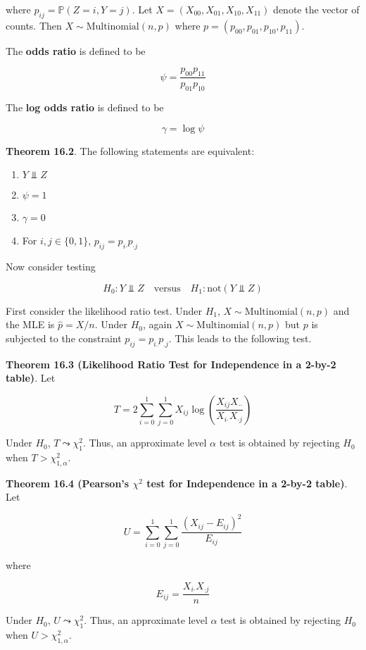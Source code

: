 where \(p_{ij} = \mathbb{P}(Z = i, Y = j)\). Let
\(X = (X_{00}, X_{01}, X_{10}, X_{11})\) denote the vector of counts.
Then \(X \sim \text{Multinomial}(n, p)\) where
\(p = (p_{00}, p_{01}, p_{10}, p_{11})\).

The \textbf{odds ratio} is defined to be

\[ \psi = \frac{p_{00} p_{11}}{p_{01} p_{10}}\]

The \textbf{log odds ratio} is defined to be

\[ \gamma = \log \psi\]

\textbf{Theorem 16.2}. The following statements are equivalent:

\begin{enumerate}[tightlist,label={\arabic*.}]
\item
  \(Y \text{ ⫫ } Z\)
\item
  \(\psi = 1\)
\item
  \(\gamma = 0\)
\item
  For \(i, j \in \{ 0, 1 \}\), \(p_{ij} = p_{i\text{·}} p_{\text{·}j}\)
\end{enumerate}

Now consider testing

\[
H_0: Y \text{ ⫫ } Z
\quad \text{versus} \quad
H_1: \text{not} (Y \text{ ⫫ } Z)
\]

First consider the likelihood ratio test. Under \(H_1\),
\(X \sim \text{Multinomial}(n, p)\) and the MLE is \(\hat{p} = X / n\).
Under \(H_0\), again \(X \sim \text{Multinomial}(n, p)\) but \(p\) is
subjected to the constraint \(p_{ij} = p_{i.} p_{.j}\). This leads to
the following test.

\textbf{Theorem 16.3 (Likelihood Ratio Test for Independence in a 2-by-2
table)}. Let

\[ T = 2 \sum_{i=0}^1 \sum_{j=0}^1 X_{ij} \log \left( \frac{X_{ij} X_{\text{··}}}{X_{i\text{·}} X_{\text{·}j}} \right)\]

Under \(H_0\), \(T \leadsto \chi_1^2\). Thus, an approximate level
\(\alpha\) test is obtained by rejecting \(H_0\) when
\(T > \chi_{1, \alpha}^2\).

\textbf{Theorem 16.4 (Pearson's \(\chi^2\) test for Independence in a
2-by-2 table)}. Let

\[ U = \sum_{i=0}^1 \sum_{j=0}^1 \frac{(X_{ij} - E_{ij})^2}{E_{ij}} \]

where

\[ E_{ij} = \frac{X_{i\text{·}} X_{\text{·}j}}{n}\]

Under \(H_0\), \(U \leadsto \chi_1^2\). Thus, an approximate level
\(\alpha\) test is obtained by rejecting \(H_0\) when
\(U > \chi_{1, \alpha}^2\).

